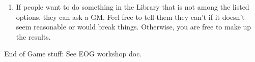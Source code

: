 \documentclass[green]{GL2020}
\begin{document}
\begin{enumerate}
\begin{enumerate}
		\item If people want to do something in the Library that is not among the listed options, they can ask a GM. Feel free to tell them they can’t if it doesn’t seem reasonable or would break things. Otherwise, you are free to make up the results.
	\end{enumerate}
\end{enumerate}

{\large End of Game stuff:}
See EOG workshop doc.
\end{document}
